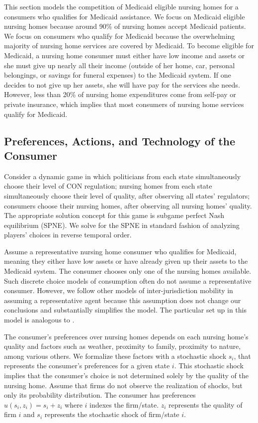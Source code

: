 \documentclass[../Main.tex]{subfiles}
\begin{document}
This section models the competition of Medicaid eligible nursing homes for a consumers who qualifies for Medicaid assistance. We focus on Medicaid eligible nursing homes because around 90\% of nursing homes accept Medicaid patients. We focus on consumers who qualify for Medicaid because the overwhelming majority of nursing home services are covered by Medicaid. To become eligible for Medicaid, a nursing home consumer must either have low income and assets or she must give up nearly all their income (outside of her home, car, personal belongings, or savings for funeral expenses) to the Medicaid system. If one decides to not give up her assets, she will have pay for the services she needs. However, less than 20\% of nursing home expenditures come from self-pay or private insurance, which implies that most consumers of nursing home services qualify for Medicaid. 

\subsection{Preferences, Actions, and Technology of the Consumer}
Consider a dynamic game in which politicians from each state simultaneously choose their level of CON regulation; nursing homes from each state simultaneously choose their level of quality, after observing all states' regulators; consumers choose their nursing homes, after observing all nursing homes' quality. The appropriate solution concept for this game is subgame perfect Nash equilibrium (SPNE). We solve for the SPNE in standard fashion of analyzing players' choices in reverse temporal order. 

Assume a representative nursing home consumer who qualifies for Medicaid, meaning they either have low assets or have already given up their assets to the Medicaid system. The consumer chooses only one of the nursing homes available. Such discrete choice models of consumption often do not assume a representative consumer. However, we follow other models of inter-jurisdiction mobility in assuming a representative agent because this assumption does not change our conclusions and substantially simplifies the model. The particular set up in this model is analogous to \citet{basinger2004remodeling}.

The consumer's preferences over nursing homes depends on each nursing home's quality and factors such as weather, proximity to family, proximity to nature, among various others. We formalize these factors with a stochastic shock $s_i$, that represents the consumer's preferences for a given state $i$. This stochastic shock implies that the consumer's choice is not determined solely by the quality of the nursing home. Assume that firms do not observe the realization of shocks, but only its probability distribution. The consumer has preferences $u(s_i,z_i) = s_i + z_i$ where $i$ indexes the firm/state. $z_i$ represents the quality of firm $i$ and $s_i$ represents the stochastic shock of firm/state $i$. 
\end{document}
